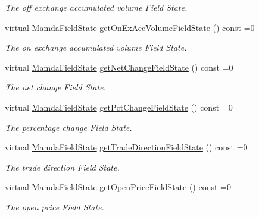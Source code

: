 \begin{CompactItemize}
\begin{CompactList}\small\item\em The off exchange accumulated volume Field State. \item\end{CompactList}\item 
virtual \hyperlink{namespaceWombat_93aac974f2ab713554fd12a1fa3b7d2a}{Mamda\-Field\-State} \hyperlink{classWombat_1_1MamdaTradeRecap_da9986c1440a9f58b1c3c477b4367bbe}{get\-On\-Ex\-Acc\-Volume\-Field\-State} () const =0
\begin{CompactList}\small\item\em The on exchange accumulated volume Field State. \item\end{CompactList}\item 
virtual \hyperlink{namespaceWombat_93aac974f2ab713554fd12a1fa3b7d2a}{Mamda\-Field\-State} \hyperlink{classWombat_1_1MamdaTradeRecap_d9ba46964e6719b4a53c2d9abcf30314}{get\-Net\-Change\-Field\-State} () const =0
\begin{CompactList}\small\item\em The net change Field State. \item\end{CompactList}\item 
virtual \hyperlink{namespaceWombat_93aac974f2ab713554fd12a1fa3b7d2a}{Mamda\-Field\-State} \hyperlink{classWombat_1_1MamdaTradeRecap_83948885b739f36f7e593d8923cb542f}{get\-Pct\-Change\-Field\-State} () const =0
\begin{CompactList}\small\item\em The percentage change Field State. \item\end{CompactList}\item 
virtual \hyperlink{namespaceWombat_93aac974f2ab713554fd12a1fa3b7d2a}{Mamda\-Field\-State} \hyperlink{classWombat_1_1MamdaTradeRecap_285abbfee630b27b7b20957f35250f19}{get\-Trade\-Direction\-Field\-State} () const =0
\begin{CompactList}\small\item\em The trade direction Field State. \item\end{CompactList}\item 
virtual \hyperlink{namespaceWombat_93aac974f2ab713554fd12a1fa3b7d2a}{Mamda\-Field\-State} \hyperlink{classWombat_1_1MamdaTradeRecap_aa06d51b6f953dbef06a4d59a8438ec1}{get\-Open\-Price\-Field\-State} () const =0
\begin{CompactList}\small\item\em The open price Field State. \item\end{CompactList}\item 

\end{CompactItemize}
